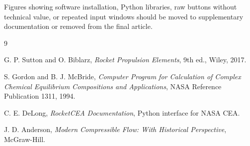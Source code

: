 \documentclass[11pt,a4paper]{article}
\begin{document}
Figures showing software installation, Python libraries, raw buttons without technical value, or repeated input windows should be moved to supplementary documentation or removed from the final article.

\begin{thebibliography}{9}

G. P. Sutton and O. Biblarz, \textit{Rocket Propulsion Elements}, 9th ed., Wiley, 2017.

S. Gordon and B. J. McBride, \textit{Computer Program for Calculation of Complex Chemical Equilibrium Compositions and Applications}, NASA Reference Publication 1311, 1994.

C. E. DeLong, \textit{RocketCEA Documentation}, Python interface for NASA CEA.

J. D. Anderson, \textit{Modern Compressible Flow: With Historical Perspective}, McGraw-Hill.

\end{thebibliography}
\end{document}
